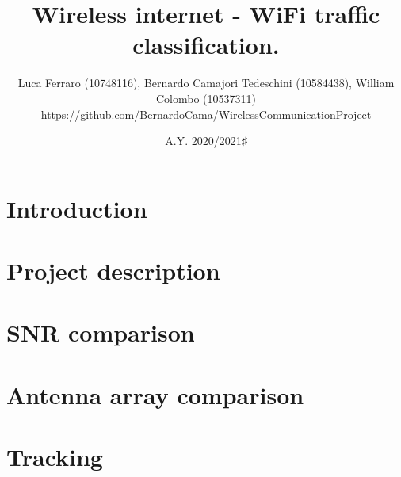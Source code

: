\documentclass{article} %
\title{\textbf{\huge{Wireless internet - WiFi traffic classification.}}}
\author{Luca Ferraro (10748116), Bernardo Camajori Tedeschini (10584438), William Colombo (10537311)\\ 
\textcolor{url_blue}{\url{https://github.com/BernardoCama/WirelessCommunicationProject}}}
\date{A.Y. 2020/2021♯}
\begin{document}

\begin{titlingpage}
    \maketitle
\end{titlingpage}

\newpage{}

\tableofcontents
\listoffigures
\lstlistoflistings
\newpage{}

\clearpage
\section{Introduction}
\label{sect:introduction}



\clearpage
\section{Project description}
\label{sect:project}



\clearpage
\section{SNR comparison}
\label{sect:project}


\clearpage
\section{Antenna array comparison}
\label{sect:project}


\clearpage
\section{Tracking}
\label{sect:project}

\end{document}
